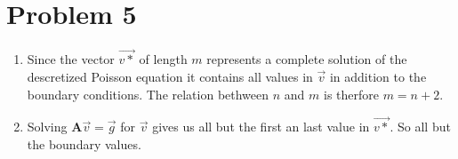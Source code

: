 \documentclass[english,notitlepage]{revtex4-1}  %
\begin{document}
\section*{Problem 5}

\begin{enumerate}[label= \alph*)]
  \item Since the vector $\vec{v*}$ of length $m$ represents a complete solution of the descretized Poisson equation it contains all values in $\vec{v}$ in addition to the boundary conditions. The relation bethween $n$ and $m$ is therfore $m=n+2$.
  \item Solving $\boldsymbol{A}\vec{v} = \vec{g}$ for $\vec{v}$ gives us all but the first an last value in $\vec{v*}$. So all but the boundary values.
\end{enumerate}
\end{document}
